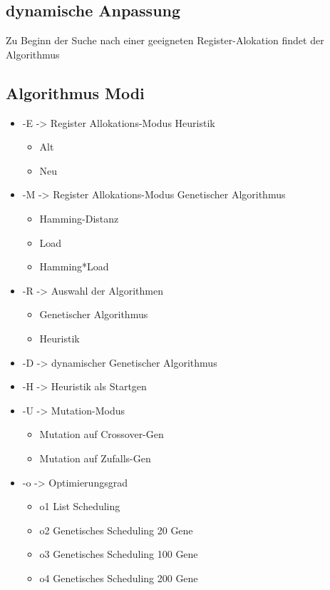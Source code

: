 \subsection{dynamische Anpassung}
Zu Beginn der Suche nach einer geeigneten Register-Alokation findet der Algorithmus
\newpage
\subsection{Algorithmus Modi}
\begin{itemize}
	 \setlength{\itemsep}{-6pt}
	\item-E -> Register Allokations-Modus Heuristik
			\begin{itemize}
				\setlength{\itemsep}{-4pt}
				\item Alt
				\item Neu
			\end{itemize}
	\item-M -> Register Allokations-Modus Genetischer Algorithmus
		\begin{itemize}
			\setlength{\itemsep}{-4pt}
			\item Hamming-Distanz
			\item Load
			\item Hamming*Load
		\end{itemize}
	\item-R -> Auswahl der Algorithmen
			\begin{itemize}
				\setlength{\itemsep}{-4pt}
				\item Genetischer Algorithmus
				\item Heuristik
			\end{itemize}
	\item-D -> dynamischer Genetischer Algorithmus
	\item-H -> Heuristik als Startgen
	\item-U -> Mutation-Modus
				\begin{itemize}
					\setlength{\itemsep}{-4pt}
					\item Mutation auf Crossover-Gen
					\item Mutation auf Zufalls-Gen
				\end{itemize}
	\item-o -> Optimierungsgrad
			\begin{itemize}
				\setlength{\itemsep}{-4pt}
				\item o1 List Scheduling
				\item o2 Genetisches Scheduling 20 Gene
				\item o3 Genetisches Scheduling 100 Gene
				\item o4 Genetisches Scheduling 200 Gene
			\end{itemize}
	
\end{itemize}


